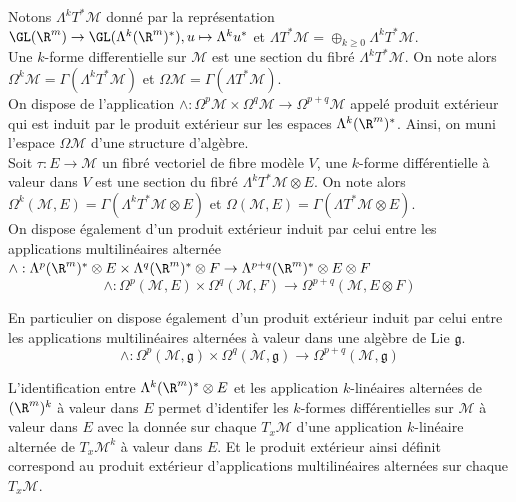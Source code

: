 \begin{defi}
Notons $\Lambda^k T^*\mathcal{M}$ donné par la représentation $\GL(\R^m) \to \GL(\Lambda^k(\R^m)^*), u\mapsto \Lambda^k u^*$ et $\Lambda T^*\mathcal{M} = \oplus_{k\geq 0} \Lambda^k T^*\mathcal{M}$. \\
Une $k$-forme differentielle sur $\mathcal{M}$ est une section du fibré $\Lambda^k T^*\mathcal{M}$. On note alors $\Omega^k\mathcal{M} = \Gamma(\Lambda^k T^*\mathcal{M})$ et $\Omega \mathcal{M} = \Gamma(\Lambda T^*\mathcal{M})$. \\

On dispose de l'application $\wedge : \Omega^p\mathcal{M} \times \Omega^q\mathcal{M} \to \Omega^{p+q}\mathcal{M}$ appelé produit extérieur qui est induit par le produit extérieur sur les espaces $\Lambda^k(\R^m)^*$. Ainsi, on muni l'espace $\Omega\mathcal{M}$ d'une structure d'algèbre. \\

Soit $\tau: E \to \mathcal{M}$ un fibré vectoriel de fibre modèle $V$, une $k$-forme différentielle à valeur dans $V$ est une section du fibré $\Lambda^k T^*\mathcal{M}\otimes E$. On note alors $\Omega^k(\mathcal{M}, E) = \Gamma(\Lambda^k T^*\mathcal{M}\otimes E)$ et $\Omega(\mathcal{M}, E) = \Gamma(\Lambda T^*\mathcal{M}\otimes E)$. \\

On dispose également d'un produit extérieur induit par celui entre les applications multilinéaires alternée $\wedge:\Lambda^p(\R^m)^* \otimes E \times \Lambda^q(\R^m)^* \otimes F \to \Lambda^{p+q}(\R^m)^* \otimes E \otimes F$  
$$\wedge: \Omega^p(\mathcal{M}, E) \times \Omega^q(\mathcal{M}, F) \to \Omega^{p+q}(\mathcal{M}, E\otimes F)$$

En particulier on dispose également d'un produit extérieur induit par celui entre les applications multilinéaires alternées à valeur dans une algèbre de Lie $\mathfrak{g}$.
$$\wedge: \Omega^p(\mathcal{M}, \mathfrak{g}) \times \Omega^q(\mathcal{M}, \mathfrak{g}) \to \Omega^{p+q}(\mathcal{M}, \mathfrak{g})$$
\end{defi}

\begin{rem}
L'identification entre $\Lambda^k(\R^m)^* \otimes E$ et les application $k$-linéaires alternées de $(\R^m)^k$ à valeur dans $E$ permet d'identifer les $k$-formes différentielles sur $\mathcal{M}$ à valeur dans $E$ avec la donnée sur chaque $T_x\mathcal{M}$ d'une application $k$-linéaire alternée de $T_x\mathcal{M}^k$ à valeur dans $E$. Et le produit extérieur ainsi définit correspond au produit extérieur d'applications multilinéaires alternées sur chaque $T_x\mathcal{M}$. 
\end{rem}

